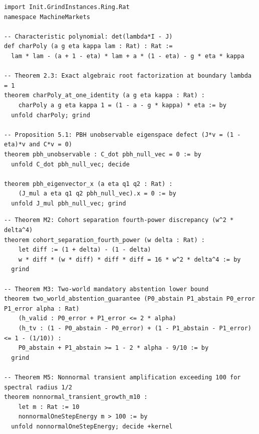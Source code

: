 \documentclass[10pt,twocolumn,letterpaper]{article}
\theoremstyle{definition}
\theoremstyle{remark}
\begin{document}
\begin{lstlisting}[language={}, numbers=none, caption={Listing C.1: Characteristic polynomial factorization and PBH unobservable defect in \texttt{lean\_proofs/Proofs/Stability.lean} and \texttt{PBHDefect.lean}.}, label={lst:lean4_stability}]
import Init.GrindInstances.Ring.Rat
namespace MachineMarkets

-- Characteristic polynomial: det(lambda*I - J)
def charPoly (a g eta kappa lam : Rat) : Rat :=
  lam * lam - (a + 1 - eta) * lam + a * (1 - eta) - g * eta * kappa

-- Theorem 2.3: Exact algebraic root factorization at boundary lambda = 1
theorem charPoly_at_one_identity (a g eta kappa : Rat) :
    charPoly a g eta kappa 1 = (1 - a - g * kappa) * eta := by
  unfold charPoly; grind

-- Proposition 5.1: PBH unobservable eigenspace defect (J*v = (1 - eta)*v and C*v = 0)
theorem pbh_unobservable : C_dot pbh_null_vec = 0 := by
  unfold C_dot pbh_null_vec; decide

theorem pbh_eigenvector_x (a eta q1 q2 : Rat) :
    (J_mul a eta q1 q2 pbh_null_vec).x = 0 := by
  unfold J_mul pbh_null_vec; grind
\end{lstlisting}

\begin{lstlisting}[language={}, numbers=none, caption={Listing C.2: Minimax sample complexity and Kreiss nonnormal transient growth in \texttt{lean\_proofs/Proofs/InformationBounds.lean}.}, label={lst:lean4_info}]
-- Theorem M2: Cohort separation fourth-power discrepancy (w^2 * delta^4)
theorem cohort_separation_fourth_power (w delta : Rat) :
    let diff := (1 + delta) - (1 - delta)
    w * diff * (w * diff) * diff * diff = 16 * w^2 * delta^4 := by
  grind

-- Theorem M3: Two-world mandatory abstention lower bound
theorem two_world_abstention_guarantee (P0_abstain P1_abstain P0_error P1_error alpha : Rat)
    (h_valid : P0_error + P1_error <= 2 * alpha)
    (h_tv : (1 - P0_abstain - P0_error) + (1 - P1_abstain - P1_error) <= 1 - (1/10)) :
    P0_abstain + P1_abstain >= 1 - 2 * alpha - 9/10 := by
  grind

-- Theorem M5: Nonnormal transient amplification exceeding 100 for spectral radius 1/2
theorem nonnormal_transient_growth_m10 :
    let m : Rat := 10
    nonnormalOneStepEnergy m > 100 := by
  unfold nonnormalOneStepEnergy; decide +kernel
\end{lstlisting}
\end{document}
